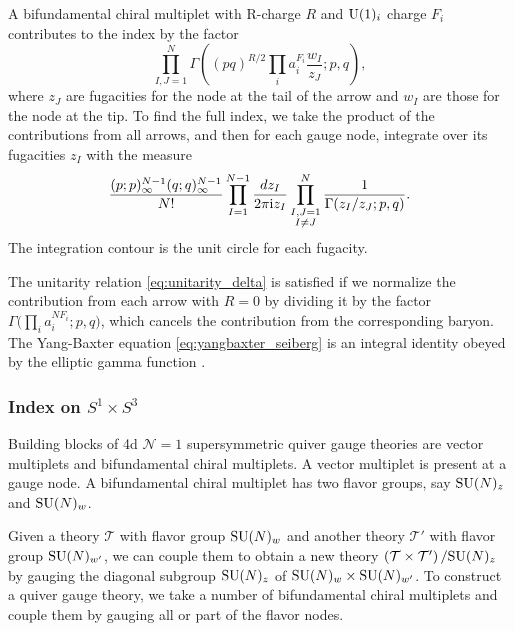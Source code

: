 A bifundamental chiral multiplet with R-charge $R$ and $\mathrm{U}(1)_i$ charge
$F_{i}$ contributes to the index by the factor
\begin{equation}
    \prod_{I,J=1}^{N}
      \Gamma\left(%
        (pq)^{R/2}\prod_{i}a_{i}^{F_{i}}\frac{w_{I}}{z_{J}};p,q
          \right),
\end{equation}
where $z_{J}$ are fugacities for the node at the tail of the arrow
and $w_{I}$ are those for the node at the tip. To find the full index,
we take the product of the contributions from all arrows, and then
for each gauge node, integrate over its fugacities $z_{I}$ with the
measure
\begin{equation}
  \frac{(p;p)_{\infty}^{N-1}(q;q)_{\infty}^{N-1}}{N!}
    \prod_{I=1}^{N-1} \frac{dz_I}{2\pi\mathrm{i} z_I}
      \prod_{\substack{I,J=1 \\ I\neq J}}^{N}\frac{1}{\Gamma(z_{I}/z_{J};p,q)}.
\end{equation}
The integration contour is the unit circle for each fugacity.

The unitarity relation \eqref{eq:unitarity_delta} is satisfied if
we normalize the contribution from each arrow with $R=0$ by dividing
it by the factor $\Gamma\big(\prod_{i}a_{i}^{NF_{i}};p,q\big)$, which cancels
the contribution from the corresponding baryon. The Yang-Baxter equation
\eqref{eq:yangbaxter_seiberg} is an integral identity obeyed by the elliptic gamma
function \cite{MR2044635,MR2630038,Dolan:2008qi}.





\subsubsection*{Index on $S^{1}\times S^{3}$}

Building blocks of 4d $\mathcal{N}=1$ supersymmetric quiver gauge
theories are vector multiplets and bifundamental chiral multiplets.
A vector multiplet is present at a gauge node. A bifundamental chiral
multiplet has two flavor groups, say $\mathrm{SU}(N)_{z}$ and $\mathrm{SU}(N)_{w}$.

Given a theory $\mathcal{T}$ with flavor group $\mathrm{SU}(N)_{w}$ and another
theory $\mathcal{T}'$ with flavor group $\mathrm{SU}(N)_{w'}$, we can couple
them to obtain a new theory $\left(\mathcal{T}\times\mathcal{T}'\right)/\mathrm{SU}(N)_{z}$
by gauging the diagonal subgroup $\mathrm{SU}(N)_{z}$ of $\mathrm{SU}(N)_{w}\times \mathrm{SU}(N)_{w'}$.
To construct a quiver gauge theory, we take a number of bifundamental
chiral multiplets and couple them by gauging all or part of the flavor
nodes.

